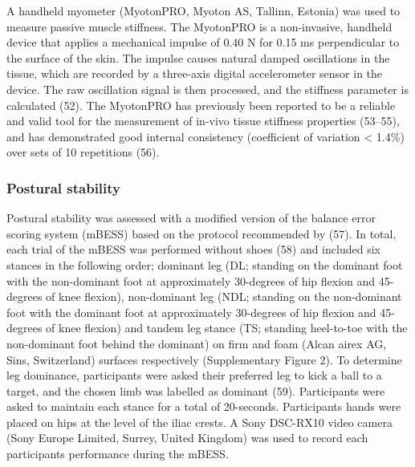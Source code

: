 \documentclass[
  english,
  man]{apa6}
\begin{document}
A handheld myometer (MyotonPRO, Myoton AS, Tallinn, Estonia) was used to measure passive muscle stiffness.
The MyotonPRO is a non-invasive, handheld device that applies a mechanical impulse of 0.40 N for 0.15 ms perpendicular to the surface of the skin.
The impulse causes natural damped oscillations in the tissue, which are recorded by a three-axis digital accelerometer sensor in the device.
The raw oscillation signal is then processed, and the stiffness parameter is calculated (52).
The MyotonPRO has previously been reported to be a reliable and valid tool for the measurement of in-vivo tissue stiffness properties (53--55), and has demonstrated good internal consistency (coefficient of variation \textless{} 1.4\%) over sets of 10 repetitions (56).

\hypertarget{postural-stability}{%
\subsubsection{Postural stability}\label{postural-stability}}

Postural stability was assessed with a modified version of the balance error scoring system (mBESS) based on the protocol recommended by (57).
In total, each trial of the mBESS was performed without shoes (58) and included six stances in the following order; dominant leg (DL; standing on the dominant foot with the non-dominant foot at approximately 30-degrees of hip flexion and 45-degrees of knee flexion), non-dominant leg (NDL; standing on the non-dominant foot with the dominant foot at approximately 30-degrees of hip flexion and 45-degrees of knee flexion) and tandem leg stance (TS; standing heel-to-toe with the non-dominant foot behind the dominant) on firm and foam (Alcan airex AG, Sins, Switzerland) surfaces respectively (Supplementary Figure 2).
To determine leg dominance, participants were asked their preferred leg to kick a ball to a target, and the chosen limb was labelled as dominant (59).
Participants were asked to maintain each stance for a total of 20-seconds.
Participants hands were placed on hips at the level of the iliac crests.
A Sony DSC-RX10 video camera (Sony Europe Limited, Surrey, United Kingdom) was used to record each participants performance during the mBESS.
\end{document}
